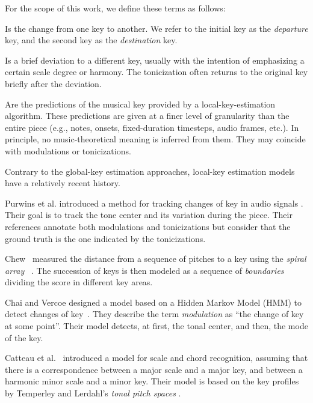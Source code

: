 For the scope of this work, we define these terms as follows:

Is the change from one key to another. We refer to the initial key as the \emph{departure} key, and the second key as the \emph{destination} key.

Is a brief deviation to a different key, usually with the intention of emphasizing a certain scale degree or harmony.
The tonicization often returns to the original key briefly after the deviation.

Are the predictions of the musical key provided by a local-key-estimation algorithm.
These predictions are given at a finer level of granularity than the entire piece (e.g., notes, onsets, fixed-duration timesteps, audio frames, etc.).
In principle, no music-theoretical meaning is inferred from them. They may coincide with modulations or tonicizations.

\label{ssec:localkey}

Contrary to the global-key estimation approaches, local-key estimation models have a relatively recent history.

Purwins et al. introduced a method for tracking changes of key in audio signals %
\cite{purwins_new_2000}.
Their goal is to track the tone center and its variation during the piece. Their references annotate both modulations and tonicizations but consider that the ground truth is the one indicated by the tonicizations.

Chew~\cite{chew2002key} measured the distance from a sequence of pitches to a key using the \emph{spiral array} ~\cite{Chew2000TowardsAM}.
The succession of keys is then modeled as a sequence of \emph{boundaries} dividing the score in different key areas.

Chai and Vercoe designed a model based on a Hidden Markov Model (HMM) to detect changes of key~\cite{chai_detection_2005}.
They describe the term \emph{modulation} as ``the change of key at some point''.
Their model detects, at first, the tonal center, and then, the mode of the key.

Catteau et al.~\cite{Catteau07tonalkey} introduced a model for scale and chord recognition, assuming that there is a correspondence between a major scale and a major key, and between a harmonic minor scale and a minor key. Their model is based on the key profiles by Temperley \cite{Temperley99:tonality} and Lerdahl's \emph{tonal pitch spaces} \cite{lerdahl88tps}.

